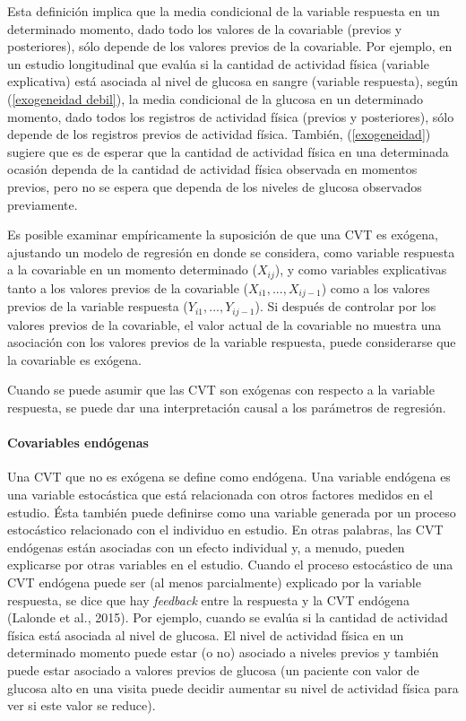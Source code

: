 \documentclass[spanish]{article}
\numberwithin{figure}{subsection}
\numberwithin{equation}{subsection}
\numberwithin{table}{subsection}
\begin{document}
Esta definición implica que la media condicional de la variable respuesta en un
determinado momento, dado todo los valores de la covariable (previos y
posteriores), sólo depende de los valores previos de la covariable. Por ejemplo,
en un estudio longitudinal que evalúa si la cantidad de actividad física
(variable explicativa) está asociada al nivel de glucosa en sangre (variable
respuesta), según (\ref{exogeneidad debil}), la media condicional de la glucosa
en un determinado momento, dado todos los registros de actividad física (previos
y posteriores), sólo depende de los registros previos de actividad física.
También, (\ref{exogeneidad}) sugiere que es de esperar que la cantidad de
actividad física en una determinada ocasión dependa de la cantidad de actividad
física observada en momentos previos, pero no se espera que dependa de los niveles
de glucosa observados previamente.

Es posible examinar empíricamente la suposición de que una CVT es exógena,
ajustando un modelo de regresión en donde se considera, como variable respuesta
a la covariable en un momento determinado ($X_{ij}$), y como variables
explicativas tanto a los valores previos de la covariable ($X_{i1}, ...,
X_{ij-1}$) como a los valores previos de la variable respuesta ($Y_{i1}, ...,
Y_{ij-1}$). Si después de controlar por los valores previos de la covariable,
el valor actual de la covariable no muestra una asociación con los valores
previos de la variable respuesta, puede considerarse que la covariable es
exógena.

Cuando se puede asumir que las CVT son exógenas con respecto a la variable
respuesta, se puede dar una interpretación causal a los parámetros de regresión.

\paragraph{Covariables endógenas} \mbox{}

Una CVT que no es exógena se define como endógena. Una variable endógena es una
variable estocástica que está relacionada con otros factores medidos en el
estudio. Ésta también puede definirse como una variable generada por un proceso
estocástico relacionado con el individuo en estudio. En otras palabras, las CVT
endógenas están asociadas con un efecto individual y, a menudo, pueden
explicarse por otras variables en el estudio. Cuando el proceso estocástico de
una CVT endógena puede ser (al menos parcialmente) explicado por la variable
respuesta, se dice que hay \textit{feedback} entre la respuesta y la CVT
endógena (Lalonde et al., 2015). Por ejemplo, cuando se evalúa si la cantidad de
actividad física está asociada al nivel de glucosa. El nivel de actividad física
en un determinado momento puede estar (o no) asociado a niveles previos y
también puede estar asociado a valores previos de glucosa (un paciente con valor
de glucosa alto en una visita puede decidir aumentar su nivel de actividad
física para ver si este valor se reduce).
\end{document}
